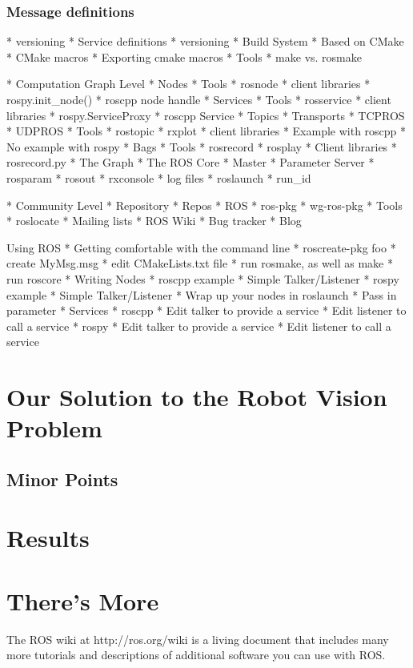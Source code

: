 \documentclass[twoside,10pt]{article}
\begin{document}
\subsubsection{Message definitions}

     * versioning
   * Service definitions
     * versioning
   * Build System
     * Based on CMake
       * CMake macros
       * Exporting cmake macros
     * Tools
       * make vs. rosmake
       
 * Computation Graph Level
   * Nodes
     * Tools
       * rosnode
     * client libraries
       * rospy.init_node()
       * roscpp node handle
   * Services
     * Tools   
       * rosservice
     * client libraries
      * rospy.ServiceProxy
       * roscpp Service
   * Topics
     * Transports
       * TCPROS
       * UDPROS
     * Tools       
       * rostopic
       * rxplot
     * client libraries
       * Example with roscpp
       * No example with rospy
   * Bags
     * Tools
       * rosrecord
       * rosplay
     * Client libraries
       * rosrecord.py
   * The Graph
     * The ROS Core
       * Master
       * Parameter Server
         * rosparam
       * rosout
         * rxconsole
         * log files
     * roslaunch
     * run_id

 * Community Level
   * Repository
     * Repos
       * ROS
       * ros-pkg
       * wg-ros-pkg
     * Tools
       * roslocate
   * Mailing lists
   * ROS Wiki
   * Bug tracker
   * Blog

Using ROS
 * Getting comfortable with the command line
   * roscreate-pkg foo
   * create MyMsg.msg
   * edit CMakeLists.txt file
   * run rosmake, as well as make
   * run roscore
 * Writing Nodes
   * roscpp example
     * Simple Talker/Listener
   * rospy example
     * Simple Talker/Listener
   * Wrap up your nodes in roslaunch
     * Pass in parameter
   * Services
     * roscpp
       * Edit talker to provide a service
       * Edit listener to call a service     
     * rospy
       * Edit talker to provide a service
       * Edit listener to call a service     


\section{Our Solution to the Robot Vision Problem}\label{sec:solution}


\subsection{Minor Points}


\section{Results}


\section{There's More}

The ROS wiki at http://ros.org/wiki is a living document that includes
many more tutorials and descriptions of additional software you can
use with ROS.

\clearpage
\end{document}
